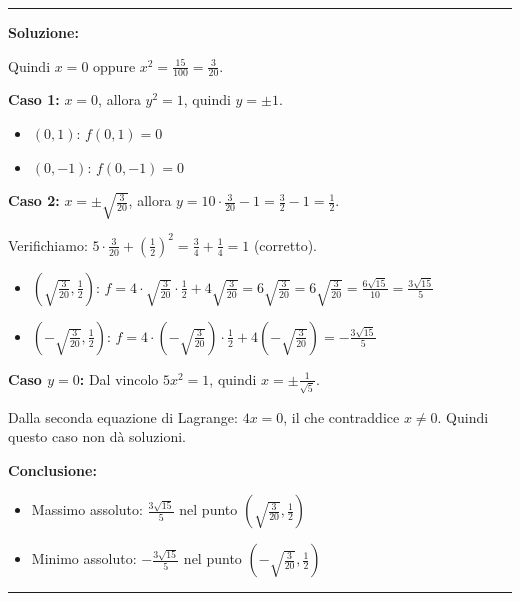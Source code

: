 \documentclass[12pt, a4paper]{article}
\newenvironment{solution}
{\par\noindent\rule{\textwidth}{0.4pt}\par\textbf{Soluzione:}\medskip\par}
{\par\rule{\textwidth}{0.4pt}\par\bigskip}
\begin{document}
\begin{solution}
Quindi $x = 0$ oppure $x^2 = \frac{15}{100} = \frac{3}{20}$.

\textbf{Caso 1:} $x = 0$, allora $y^2 = 1$, quindi $y = \pm 1$.
\begin{itemize}
    \item $(0, 1)$: $f(0, 1) = 0$
    \item $(0, -1)$: $f(0, -1) = 0$
\end{itemize}

\textbf{Caso 2:} $x = \pm\sqrt{\frac{3}{20}}$, allora $y = 10 \cdot \frac{3}{20} - 1 = \frac{3}{2} - 1 = \frac{1}{2}$.

Verifichiamo: $5 \cdot \frac{3}{20} + \left(\frac{1}{2}\right)^2 = \frac{3}{4} + \frac{1}{4} = 1$ (corretto).

\begin{itemize}
    \item $\left(\sqrt{\frac{3}{20}}, \frac{1}{2}\right)$: $f = 4 \cdot \sqrt{\frac{3}{20}} \cdot \frac{1}{2} + 4\sqrt{\frac{3}{20}} = 6\sqrt{\frac{3}{20}} = 6\sqrt{\frac{3}{20}} = \frac{6\sqrt{15}}{10} = \frac{3\sqrt{15}}{5}$
    \item $\left(-\sqrt{\frac{3}{20}}, \frac{1}{2}\right)$: $f = 4 \cdot \left(-\sqrt{\frac{3}{20}}\right) \cdot \frac{1}{2} + 4\left(-\sqrt{\frac{3}{20}}\right) = -\frac{3\sqrt{15}}{5}$
\end{itemize}

\textbf{Caso $y = 0$:} Dal vincolo $5x^2 = 1$, quindi $x = \pm\frac{1}{\sqrt{5}}$.

Dalla seconda equazione di Lagrange: $4x = 0$, il che contraddice $x \neq 0$. Quindi questo caso non dà soluzioni.

\textbf{Conclusione:}
\begin{itemize}
    \item Massimo assoluto: $\frac{3\sqrt{15}}{5}$ nel punto $\left(\sqrt{\frac{3}{20}}, \frac{1}{2}\right)$
    \item Minimo assoluto: $-\frac{3\sqrt{15}}{5}$ nel punto $\left(-\sqrt{\frac{3}{20}}, \frac{1}{2}\right)$
\end{itemize}
\end{solution}
\end{document}
